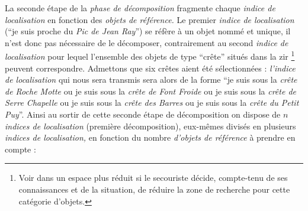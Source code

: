 La seconde étape de la \emph{phase de décomposition} fragmente chaque
\emph{indice de localisation} en fonction des \emph{objets de
  référence.} Le premier \emph{indice de localisation} (\enquote{je
  suis proche du \emph{Pic de Jean Ray}}) se réfère à un objet nommé
et unique, il n'est donc pas nécessaire de le décomposer,
contrairement au second \emph{indice de localisation} pour lequel
l'ensemble des objets de type \enquote{crête} situés dans la \ac{zir}
\footnote{Voir dans un espace plus réduit si le secouriste décide,
  compte-tenu de ses connaissances et de la situation, de réduire la
  zone de recherche pour cette catégorie d'objets.} peuvent
correspondre. Admettons que six crêtes aient été sélectionnées :
\emph{l'indice de localisation} qui nous sera transmis sera alors de
la forme \enquote{je suis sous la \emph{crête de Roche Motte} ou je
  suis sous la \emph{crête de Font Froide} ou je suis sous la
  \emph{crête de Serre Chapelle} ou je suis sous la \emph{crête des
    Barres} ou je suis sous la \emph{crête du Petit Puy}}. Ainsi au
sortir de cette seconde étape de décomposition on dispose de \(n\)
\emph{indices de localisation} (première décomposition), eux-mêmes
divisés en plusieurs \emph{indices de localisation,} en fonction du
nombre \emph{d'objets de référence} à prendre en compte :

\begin{quote}
\end{quote}

